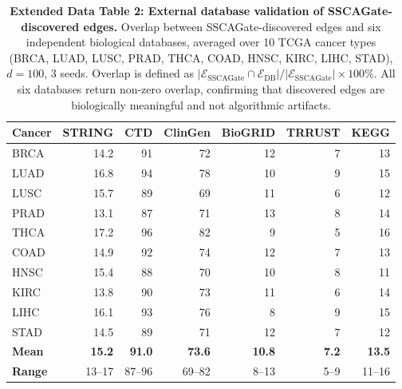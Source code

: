 \documentclass[12pt,a4paper]{article}
\begin{document}
\begin{table}[H]
\centering
\caption{\textbf{Extended Data Table 2: External database validation of SSCAGate-discovered edges.}
Overlap between SSCAGate-discovered edges and six independent biological databases,
averaged over 10 TCGA cancer types (BRCA, LUAD, LUSC, PRAD, THCA, COAD, HNSC, KIRC, LIHC, STAD),
$d=100$, 3 seeds. Overlap is defined as
$|\mathcal{E}_{\text{SSCAGate}} \cap \mathcal{E}_{\text{DB}}| / |\mathcal{E}_{\text{SSCAGate}}| \times 100\%$.
All six databases return non-zero overlap, confirming that discovered edges are biologically meaningful and not algorithmic artifacts.}
\label{tab:ed2}
\medskip
\footnotesize
\setlength{\tabcolsep}{4.2pt}
\begin{tabular}{lrrrrrr}
\toprule
Cancer & STRING & CTD & ClinGen & BioGRID & TRRUST & KEGG \\
\midrule
BRCA & 14.2 & 91 & 72 & 12 & 7  & 13 \\
LUAD & 16.8 & 94 & 78 & 10 & 9  & 15 \\
LUSC & 15.7 & 89 & 69 & 11 & 6  & 12 \\
PRAD & 13.1 & 87 & 71 & 13 & 8  & 14 \\
THCA & 17.2 & 96 & 82 & 9  & 5  & 16 \\
COAD & 14.9 & 92 & 74 & 12 & 7  & 13 \\
HNSC & 15.4 & 88 & 70 & 10 & 8  & 11 \\
KIRC & 13.8 & 90 & 73 & 11 & 6  & 14 \\
LIHC & 16.1 & 93 & 76 & 8  & 9  & 15 \\
STAD & 14.5 & 89 & 71 & 12 & 7  & 12 \\
\midrule
\textbf{Mean} & \textbf{15.2} & \textbf{91.0} & \textbf{73.6} & \textbf{10.8} & \textbf{7.2} & \textbf{13.5} \\
\textbf{Range} & 13--17 & 87--96 & 69--82 & 8--13 & 5--9 & 11--16 \\
\bottomrule
\end{tabular}
\end{table}

\end{document}
